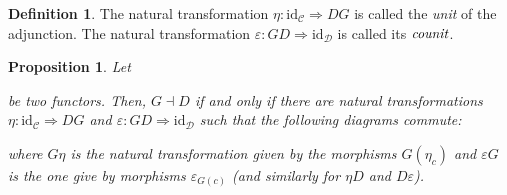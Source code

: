 \documentclass{article}
\newcommand{\id}{\mathrm{id}}
\newcommand{\cat}{\mathcal{C}}
\newcommand{\catt}{\mathcal{D}}
\renewcommand{\epsilon}{\varepsilon}
\theoremstyle{plain}
\newtheorem{proposition}[theorem]{Proposition}
\theoremstyle{definition}
\newtheorem{definition}[theorem]{Definition}
\theoremstyle{remark}
\begin{document}
\begin{definition}
    The natural transformation $\eta : \id_\cat \Rightarrow DG$ is called the \emph{unit} of the adjunction. The natural transformation $\epsilon : GD \Rightarrow \id_\catt$ is called its $\emph{counit}$.
\end{definition}

\begin{proposition}
    Let  be two functors. Then, $G \dashv D$ if and only if there are natural transformations $\eta : \id_\cat \Rightarrow DG$ and $\epsilon : GD \Rightarrow \id_\catt$ such that the following diagrams commute:
    \begin{center}
    \end{center}
    where $G\eta$ is the natural transformation given by the morphisms $G(\eta_c)$ and $\epsilon G$ is the one give by morphisms $\epsilon_{G(c)}$ (and similarly for $\eta D$ and $D\epsilon$).
\end{proposition}
\end{document}
